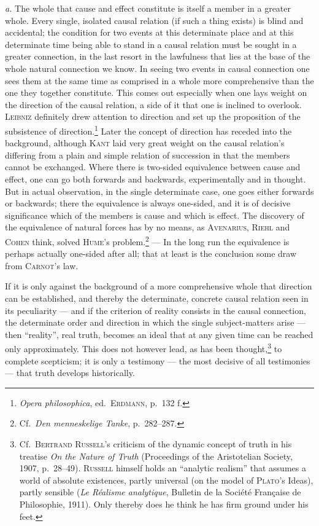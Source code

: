 \documentclass[12pt]{book}
\newcommand{\opage}[1]{\marginnote{\footnotesize\textit{[#1]}}}
\begin{document}
\textit{a.} The whole that cause and effect constitute is itself a member in a
greater whole. Every single, isolated causal relation (if such a thing exists) is
blind and accidental; the condition for two events at this determinate place and at
this determinate time being able to stand in a causal relation must be sought in a
greater connection, in the last resort in the lawfulness that lies at the base of
the whole natural connection we know. In seeing two events in causal connection one
sees them at the same time as \opage{49}comprised in a whole more comprehensive than the one
they together constitute. This comes out especially when one lays weight on the
direction of the causal relation, a side of it that one is inclined to overlook.
\textsc{Leibniz} definitely drew attention to direction and set up the proposition
of the subsistence of direction.\footnote{\textit{Opera philosophica}, ed.\
\textsc{Erdmann}, p.\ 132 f.} Later the concept of direction has receded into the
background, although \textsc{Kant} laid very great weight on the causal relation's
differing from a plain and simple relation of succession in that the members cannot
be exchanged. Where there is two-sided equivalence between cause and effect, one can
go both forwards and backwards, experimentally and in thought. But in actual
observation, in the single determinate case, one goes either forwards or backwards;
there the equivalence is always one-sided, and it is of decisive significance which
of the members is cause and which is effect. The discovery of the equivalence of
natural forces has by no means, as \textsc{Avenarius}, \textsc{Riehl} and
\textsc{Cohen} think, solved \textsc{Hume}'s
problem.\footnote{Cf.\ \textit{Den menneskelige Tanke}, p.\ 282--287.} --- In the
long run the equivalence is perhaps actually one-sided after all; that at least is
the conclusion some draw from \textsc{Carnot}'s law.

If it is only against the background of a more comprehensive whole that direction can
be established, and thereby the determinate, concrete causal relation seen in its
peculiarity --- and if the criterion of reality consists in the causal connection,
the determinate order and direction in which the single subject-matters arise ---
then ``reality'', real truth, becomes an ideal that at any given time can be reached
only approximately. This does not however lead, as has been
thought,\footnote{Cf.\ \textsc{Bertrand Russell}'s criticism of the dynamic concept
of truth in his treatise \textit{On the Nature of Truth} (Proceedings of the
Aristotelian Society, 1907, p.\ 28--49). \textsc{Russell} himself holds an
``analytic realism'' that assumes a world of absolute existences, partly universal
(on the model of \textsc{Plato}'s Ideas), partly sensible (\textit{Le Réalisme
analytique}, Bulletin de la Société Française de Philosophie, 1911). Only thereby
does he think he has firm ground under his feet.} to complete scepticism; it is only
a testimony --- the most decisive of all testimonies --- that truth develops
historically.
\end{document}

